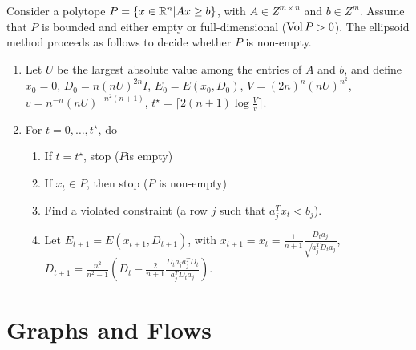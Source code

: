 \begin{defn}
  \label{sec:ellipsoid-method-1}
  Consider a polytope $P = \{ x \in \mathbb{R}^{n} | Ax \geq b \} $, with $A \in
  Z^{m \times n}$ and $b \in Z^{m}$.  Assume that $P$ is bounded and
  either empty or full-dimensional ($\operatorname*{Vol} P > 0$).  The ellipsoid
  method proceeds as follows to decide whether $P$ is non-empty.

  \begin{enumerate}
  \item Let $U$ be the largest absolute value among the entries of $A$
    and $b$, and define $x_{0} = 0$, $D_{0} = n(nU)^{2n}I$, $E_{0} =
    E(x_{0}, D_{0})$, $V = (2n)^{n}(nU)^{n^{2}}$, $v =
    n^{-n}(nU)^{-n^{2}(n+1)}$, $t^{\star} = \lceil 2(n+1) \log
    \frac{V}{v} \rceil$.
  \item For $t = 0, \dots, t^{\star}$, do
    \begin{enumerate}
    \item If $t = t^{\star}$, stop ($P$is empty)
    \item If $x_{t} \in P$, then stop ($P$ is non-empty)
    \item Find a violated constraint (a row $j$ such that $a_{j}^{T}
      x_{t} < b_{j}$).
    \item Let $E_{t+1} = E(x_{t+1}, D_{t+1})$, with $x_{t+1} = x_{t} =
      \frac{1}{n+1} \frac{D_{t} a_{j}}{\sqrt{a_{j}^{T} D_{t} a_{j}}}$,
      $D_{t+1} = \frac{n^{2}}{n^{2} - 1}(D_{t} - \frac{2}{n+1}
      \frac{D_{t} a_{j} a_{j}^{T} D_{t}}{a_{j}^{T} D_{t} a_{j}})$.
    \end{enumerate}
  \end{enumerate}
\end{defn}


\section{Graphs and Flows}
\label{sec:graphs-flows}

